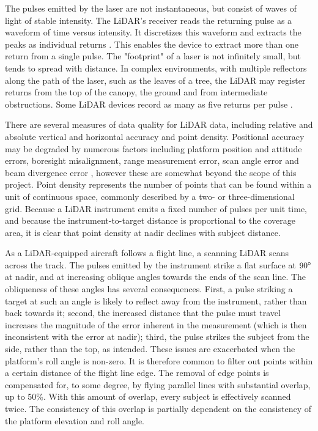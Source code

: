\documentclass[10pt]{article}
\begin{document}
The pulses emitted by the laser are not instantaneous, but consist of waves of light of stable intensity. The LiDAR's receiver reads the returning pulse as a waveform of time versus intensity. It discretizes this waveform and extracts the peaks as individual returns \cite{Lillesand1999}. This enables the device to extract more than one return from a single pulse. The "footprint" of a laser is not infinitely small, but tends to spread with distance. In complex environments, with multiple reflectors along the path of the laser, such as the leaves of a tree, the LiDAR may register returns from the top of the canopy, the ground and from intermediate obstructions. Some LiDAR devices record as many as five returns per pulse \cite{Lillesand1999}.

There are several measures of data quality for LiDAR data, including relative and absolute vertical and horizontal accuracy and point density. Positional accuracy may be degraded by numerous factors including platform position and attitude errors, boresight misalignment, range measurement error, scan angle error and beam divergence error \cite{May2007}, however these are somewhat beyond the scope of this project. Point density represents the number of points that can be found within a unit of continuous space, commonly described by a two- or three-dimensional grid. Because a LiDAR instrument emits a fixed number of pulses per unit time, and because the instrument-to-target distance is proportional to the coverage area, it is clear that point density at nadir declines with subject distance. 

As a LiDAR-equipped aircraft follows a flight line, a scanning LiDAR scans across the track. The pulses emitted by the instrument strike a flat surface at $90\degree$ at nadir, and at increasing oblique angles towards the ends of the scan line. The obliqueness of these angles has several consequences. First, a pulse striking a target at such an angle is likely to reflect away from the instrument, rather than back towards it; second, the increased distance that the pulse must travel increases the magnitude of the error inherent in the measurement (which is then inconsistent with the error at nadir); third, the pulse strikes the subject from the side, rather than the top, as intended. These issues are exacerbated when the platform's roll angle is non-zero. It is therefore common to filter out points within a certain distance of the flight line edge. The removal of edge points is compensated for, to some degree, by flying parallel lines with substantial overlap, up to 50\%. With this amount of overlap, every subject is effectively scanned twice. The consistency of this overlap is partially dependent on the consistency of the platform elevation and roll angle.
\end{document}
